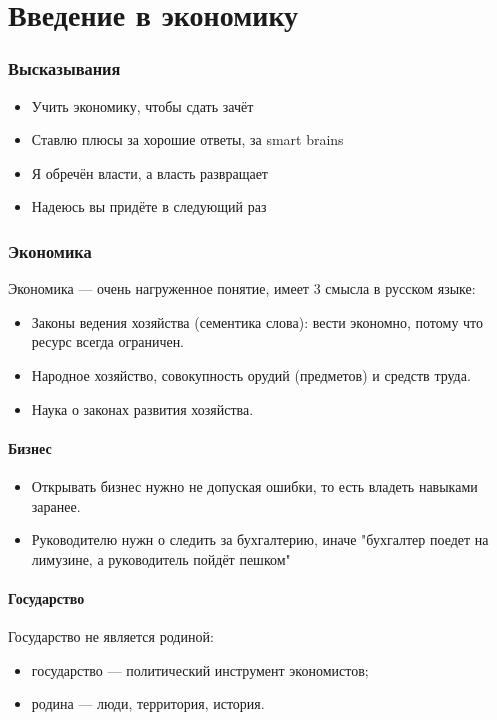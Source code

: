 \documentclass{article}
\begin{document}
\newpage
\part{Введение в экономику}

\section{Высказывания}
\begin{itemize}
    \item Учить экономику, чтобы сдать зачёт
    \item Ставлю плюсы за хорошие ответы, за smart brains
    \item Я обречён власти, а власть развращает
    \item Надеюсь вы придёте в следующий раз
\end{itemize}



\section{Экономика}
Экономика --- очень нагруженное понятие, имеет 3 смысла в русском языке:
\begin{itemize}
    \item Законы ведения хозяйства (сементика слова): вести экономно, потому что ресурс всегда ограничен.
    \item Народное хозяйство, совокупность орудий (предметов) и средств труда.
    \item Наука о законах развития хозяйства.
\end{itemize}

\subsection{Бизнес}
\begin{itemize}
    \item Открывать бизнес нужно не допуская ошибки, то есть владеть навыками заранее.
    \item Руководителю нужн о следить за бухгалтерию, иначе "бухгалтер поедет на лимузине, а руководитель пойдёт пешком"
\end{itemize}


\subsection{Государство}
Государство не является родиной:
\begin{itemize}
    \item государство --- политический инструмент экономистов;
    \item родина --- люди, территория, история.
\end{itemize}
\end{document}
